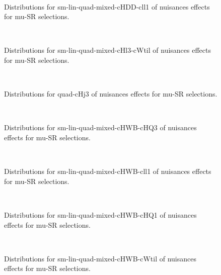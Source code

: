 \begin{figure}[htbp]  
\centering 
\\ 
\caption{ 
   Distributions for sm-lin-quad-mixed-cHDD-cll1 of nuisances effects for mu-SR selections.
} 
\label{fig:sm_lin_quad_mixed_cHDD_cll1_mu_SR} 
\end{figure} 




\begin{figure}[htbp]  
\centering 
\\ 
\caption{ 
   Distributions for sm-lin-quad-mixed-cHl3-cWtil of nuisances effects for mu-SR selections.
} 
\label{fig:sm_lin_quad_mixed_cHl3_cWtil_mu_SR} 
\end{figure} 




\begin{figure}[htbp]  
\centering 
\\ 
\caption{ 
   Distributions for quad-cHj3 of nuisances effects for mu-SR selections.
} 
\label{fig:quad_cHj3_mu_SR} 
\end{figure} 




\begin{figure}[htbp]  
\centering 
\\ 
\caption{ 
   Distributions for sm-lin-quad-mixed-cHWB-cHQ3 of nuisances effects for mu-SR selections.
} 
\label{fig:sm_lin_quad_mixed_cHWB_cHQ3_mu_SR} 
\end{figure} 




\begin{figure}[htbp]  
\centering 
\\ 
\caption{ 
   Distributions for sm-lin-quad-mixed-cHWB-cll1 of nuisances effects for mu-SR selections.
} 
\label{fig:sm_lin_quad_mixed_cHWB_cll1_mu_SR} 
\end{figure} 




\begin{figure}[htbp]  
\centering 
\\ 
\caption{ 
   Distributions for sm-lin-quad-mixed-cHWB-cHQ1 of nuisances effects for mu-SR selections.
} 
\label{fig:sm_lin_quad_mixed_cHWB_cHQ1_mu_SR} 
\end{figure} 




\begin{figure}[htbp]  
\centering 
\\ 
\caption{ 
   Distributions for sm-lin-quad-mixed-cHWB-cWtil of nuisances effects for mu-SR selections.
} 
\label{fig:sm_lin_quad_mixed_cHWB_cWtil_mu_SR} 
\end{figure} 




